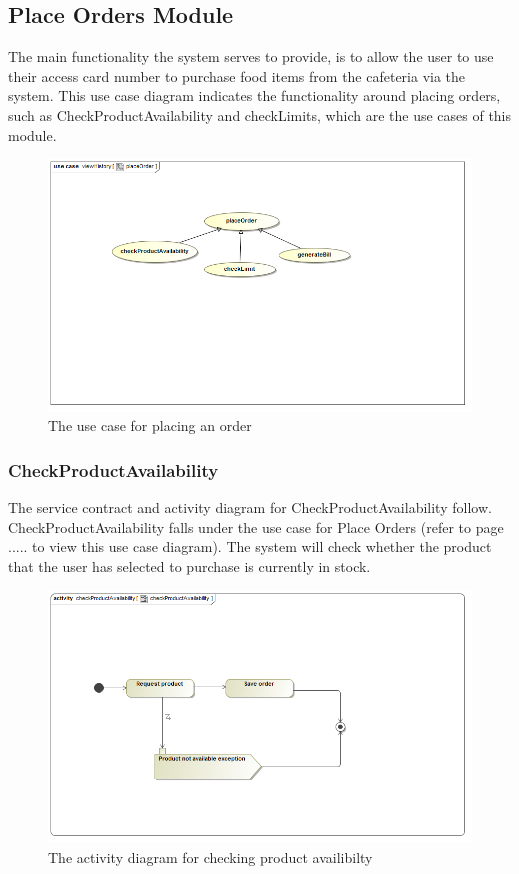 \documentclass[a4paper,12pt]{article}
\begin{document}
\subsection{Place Orders Module}
The main functionality the system serves to provide, is  to allow the user to use their access card number to purchase food items from the cafeteria via the system. This use case diagram indicates the functionality around placing orders, such as CheckProductAvailability and checkLimits, which are the use cases of this module.
\begin{figure}[H]
  \centering
    \includegraphics[width=1.0\textwidth]{images/placeOrder.png}
    \caption{The use case for placing an order} 
\end{figure}
 
\subsubsection{CheckProductAvailability}
The service contract and activity diagram for CheckProductAvailability follow. CheckProductAvailability falls under the use case for Place Orders (refer to page ..... to view this use case diagram). The system will check whether the product that the user has selected to purchase is currently in stock.
\begin{figure}[H]
  \centering
    \includegraphics[width=1.0\textwidth]{images/checkProductAvailability.png}
    \caption{The activity diagram for checking product availibilty } 
\end{figure}
 
\end{document}

